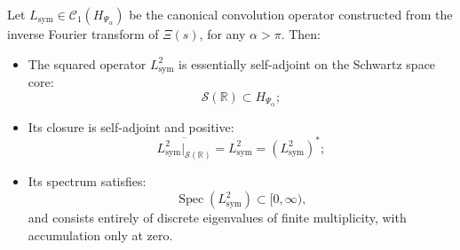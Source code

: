 \begin{lemma}
\label{lem:Lsym_square_selfadjoint}
Let \( L_{\mathrm{sym}} \in \mathcal{C}_1(H_{\Psi_\alpha}) \) be the canonical convolution operator constructed from the inverse Fourier transform of \( \Xi(s) \), for any \( \alpha > \pi \). Then:
\begin{itemize}
  \item The squared operator \( L_{\mathrm{sym}}^2 \) is essentially self-adjoint on the Schwartz space core:
  \[
  \mathcal{S}(\mathbb{R}) \subset H_{\Psi_\alpha};
  \]

  \item Its closure is self-adjoint and positive:
  \[
  \overline{L_{\mathrm{sym}}^2|_{\mathcal{S}(\mathbb{R})}} = L_{\mathrm{sym}}^2 = \left( L_{\mathrm{sym}}^2 \right)^*;
  \]

  \item Its spectrum satisfies:
  \[
  \operatorname{Spec}(L_{\mathrm{sym}}^2) \subset [0, \infty),
  \]
  and consists entirely of discrete eigenvalues of finite multiplicity, with accumulation only at zero.
\end{itemize}
\end{lemma}
